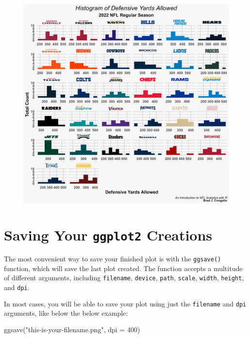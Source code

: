 \documentclass[
  letterpaper,
]{krantz}
\newenvironment{Shaded}{\begin{snugshade}}{\end{snugshade}}
\newcommand{\AttributeTok}[1]{\textcolor[rgb]{0.40,0.45,0.13}{#1}}
\newcommand{\DecValTok}[1]{\textcolor[rgb]{0.68,0.00,0.00}{#1}}
\newcommand{\FunctionTok}[1]{\textcolor[rgb]{0.28,0.35,0.67}{#1}}
\newcommand{\NormalTok}[1]{\textcolor[rgb]{0.00,0.23,0.31}{#1}}
\newcommand{\StringTok}[1]{\textcolor[rgb]{0.13,0.47,0.30}{#1}}
\begin{document}
\begin{figure}

{\centering \includegraphics[width=5.25in,height=\textheight]{images/completed_def_histogram.png}

}

\end{figure}

\hypertarget{saving-your-ggplot2-creations}{%
\section{\texorpdfstring{Saving Your \texttt{ggplot2}
Creations}{Saving Your ggplot2 Creations}}\label{saving-your-ggplot2-creations}}

The most convenient way to save your finished plot is with the
\texttt{ggsave()} function, which will save the last plot created. The
function accepts a multitude of different arguments, including
\texttt{filename}, \texttt{device}, \texttt{path}, \texttt{scale},
\texttt{width}, \texttt{height}, and \texttt{dpi}.

In most cases, you will be able to save your plot using just the
\texttt{filename} and \texttt{dpi} arguments, like below the below
example:

\begin{Shaded}
\begin{Highlighting}[]
\FunctionTok{ggsave}\NormalTok{(}\StringTok{"this{-}is{-}your{-}filename.png"}\NormalTok{, }\AttributeTok{dpi =} \DecValTok{400}\NormalTok{)}
\end{Highlighting}
\end{Shaded}
\end{document}
